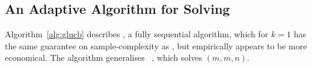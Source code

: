 \subsection{An Adaptive Algorithm for Solving \protect\QFK} %
\label{sec:adaptive}



Algorithm~\ref{alg:glucb} describes \GLUCB, a fully sequential algorithm, which for $k=1$ has the same
guarantee on sample-complexity as \FF, but empirically appears to be more economical. The algorithm  generalises \LUCB~\cite{bib:lucb}, which solves $(m, m, n)$. 



